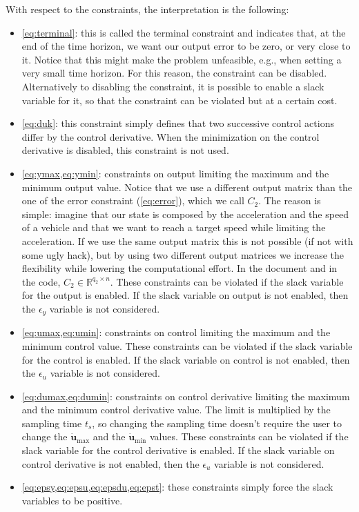 \documentclass[10pt,a4paper]{article}
\newcommand{\dumin}{\ensuremath{\bm{\dot{u}}_\text{min}}\xspace}
\newcommand{\dumax}{\ensuremath{\bm{\dot{u}}_\text{max}}\xspace}
\newcommand{\epsy}{\ensuremath{\epsilon_{y}}\xspace}
\newcommand{\epsu}{\ensuremath{\epsilon_{u}}\xspace}
\newcommand{\R}{\ensuremath{\mathbb{R}\xspace}}
\newcommand{\ts}{\ensuremath{t_s}}
\newcommand{\Cc}{\ensuremath{C_2}}
\begin{document}
With respect to the constraints, the interpretation is the following:
\begin{itemize}
    \item \cref{eq:terminal}: this is called the terminal constraint and indicates that, at the end of the time horizon, we want our output error to be zero, or very close to it. Notice that this might make the problem unfeasible, e.g., when setting a very small time horizon. For this reason, the constraint can be disabled. Alternatively to disabling the constraint, it is possible to enable a slack variable for it, so that the constraint can be violated but at a certain cost.
    \item \cref{eq:duk}: this constraint simply defines that two successive control actions differ by the control derivative. When the minimization on the control derivative is disabled, this constraint is not used.
    \item \cref{eq:ymax,eq:ymin}: constraints on output limiting the maximum and the minimum output value. Notice that we use a different output matrix than the one of the error constraint (\cref{eq:error}), which we call \Cc. The reason is simple: imagine that our state is composed by the acceleration and the speed of a vehicle and that we want to reach a target speed while limiting the acceleration. If we use the same output matrix this is not possible (if not with some ugly hack), but by using two different output matrices we increase the flexibility while lowering the computational effort. In the document and in the code, $\Cc \in \R^{q_2 \times n}$. These constraints can be violated if the slack variable for the output is enabled. If the slack variable on output is not enabled, then the \epsy variable is not considered.
    \item \cref{eq:umax,eq:umin}: constraints on control limiting the maximum and the minimum control value. These constraints can be violated if the slack variable for the control is enabled. If the slack variable on control is not enabled, then the \epsu variable is not considered.
    \item \cref{eq:dumax,eq:dumin}: constraints on control derivative limiting the maximum and the minimum control derivative value. The limit is multiplied by the sampling time \ts, so changing the sampling time doesn't require the user to change the \dumax and the \dumin values. These constraints can be violated if the slack variable for the control derivative is enabled. If the slack variable on control derivative is not enabled, then the \epsu variable is not considered.
    \item \cref{eq:epsy,eq:epsu,eq:epsdu,eq:epst}: these constraints simply force the slack variables to be positive.
\end{itemize}
\end{document}

